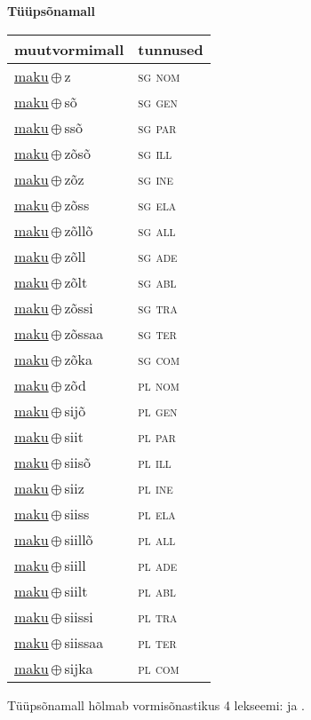 

\vspace{3.5em}
\noindent \begin{minipage}{\textwidth}
\noindent \textbf{Tüüpsõnamall \,}\\

\begin{sideways}
\begin{tabular}{l l}
muutvormimall & tunnused \\
\hline
\underline{maku}\,$\oplus$\,z & \textsc{ sg nom } \\
\underline{maku}\,$\oplus$\,sõ & \textsc{ sg gen } \\
\underline{maku}\,$\oplus$\,ssõ & \textsc{ sg par } \\
\underline{maku}\,$\oplus$\,zõsõ & \textsc{ sg ill } \\
\underline{maku}\,$\oplus$\,zõz & \textsc{ sg ine } \\
\underline{maku}\,$\oplus$\,zõss & \textsc{ sg ela } \\
\underline{maku}\,$\oplus$\,zõllõ & \textsc{ sg all } \\
\underline{maku}\,$\oplus$\,zõll & \textsc{ sg ade } \\
\underline{maku}\,$\oplus$\,zõlt & \textsc{ sg abl } \\
\underline{maku}\,$\oplus$\,zõssi & \textsc{ sg tra } \\
\underline{maku}\,$\oplus$\,zõssaa & \textsc{ sg ter } \\
\underline{maku}\,$\oplus$\,zõka & \textsc{ sg com } \\
\underline{maku}\,$\oplus$\,zõd & \textsc{ pl nom } \\
\underline{maku}\,$\oplus$\,sijõ & \textsc{ pl gen } \\
\underline{maku}\,$\oplus$\,siit & \textsc{ pl par } \\
\underline{maku}\,$\oplus$\,siisõ & \textsc{ pl ill } \\
\underline{maku}\,$\oplus$\,siiz & \textsc{ pl ine } \\
\underline{maku}\,$\oplus$\,siiss & \textsc{ pl ela } \\
\underline{maku}\,$\oplus$\,siillõ & \textsc{ pl all } \\
\underline{maku}\,$\oplus$\,siill & \textsc{ pl ade } \\
\underline{maku}\,$\oplus$\,siilt & \textsc{ pl abl } \\
\underline{maku}\,$\oplus$\,siissi & \textsc{ pl tra } \\
\underline{maku}\,$\oplus$\,siissaa & \textsc{ pl ter } \\
\underline{maku}\,$\oplus$\,sijka & \textsc{ pl com } \\
\end{tabular}
\end{sideways}
\label{tab:tüüpsõnamall-makuz}

\end{minipage}

 
\vspace{1em}
\noindent Tüüpsõnamall  hõlmab vormisõnastikus 4 lekseemi:  ja .
